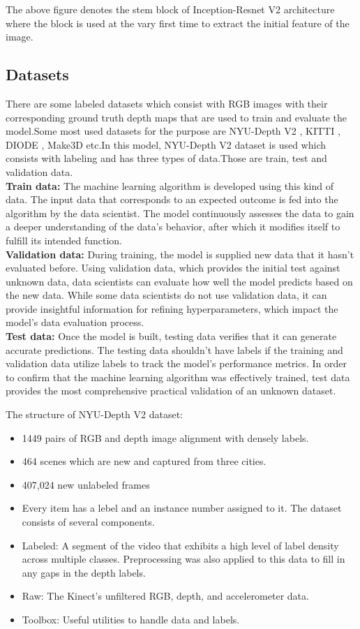 \documentclass[a4paper,12pt,oneside]{book}
\begin{document}
The above figure denotes the stem block of Inception-Resnet V2 architecture where the block is used at the vary first time to extract the initial feature of the image.
\newpage

\subsection{Datasets}
There are some labeled datasets which consist with RGB images with their corresponding ground truth depth maps that are used to train and evaluate the model.Some most used datasets for the purpose are NYU-Depth V2 \cite{laina2016deeper}, KITTI \cite{kitti}, DIODE \cite{diode}, Make3D etc.In this model, NYU-Depth V2 \cite{laina2016deeper}  dataset is used which consists with labeling and has three types of data.Those are train, test and validation data.\\
\textbf{Train data:}
The machine learning algorithm is developed using this kind of data. The input data that corresponds to an expected outcome is fed into the algorithm by the data scientist. The model continuously assesses the data to gain a deeper understanding of the data's behavior, after which it modifies itself to fulfill its intended function.\\
\textbf{Validation data:}
During training, the model is supplied new data that it hasn't evaluated before. Using validation data, which provides the initial test against unknown data, data scientists can evaluate how well the model predicts based on the new data. While some data scientists do not use validation data, it can provide insightful information for refining hyperparameters, which impact the model's data evaluation process.\\
\textbf{Test data:}
Once the model is built, testing data verifies that it can generate accurate predictions. The testing data shouldn't have labels if the training and validation data utilize labels to track the model's performance metrics. In order to confirm that the machine learning algorithm was effectively trained, test data provides the most comprehensive practical validation of an unknown dataset.

The structure of NYU-Depth V2 dataset:
\begin{itemize}
    \item 1449 pairs of RGB and depth image alignment with densely labels.
    \item 464 scenes which are new and captured from three cities.
    \item 407,024 new unlabeled frames
    \item Every item has a lebel and an instance number assigned to it. The dataset consists of several components.
    \item Labeled: A segment of the video that exhibits a high level of label density across multiple classes. Preprocessing was also applied to this data to fill in any gaps in the depth labels.
   \item Raw: The Kinect's unfiltered RGB, depth, and accelerometer data.
   \item Toolbox: Useful utilities to handle data and labels.
\end{itemize}
\end{document}
